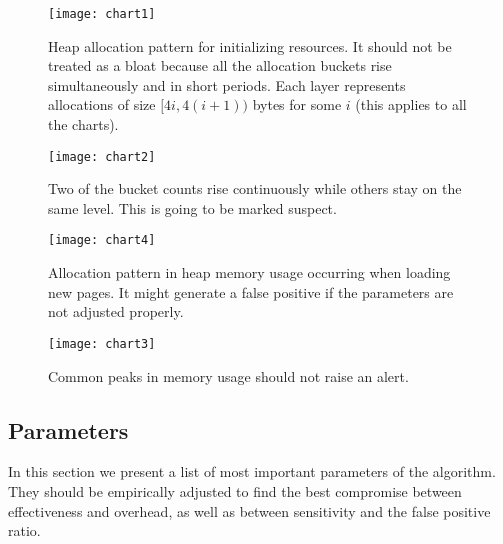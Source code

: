 \documentclass[preprint, numbers]{sigplanconf}
\begin{document}
\begin{figure}
\centering
\texttt{[image: chart1]}
\caption{Heap allocation pattern for initializing resources.
	It should not be treated as a bloat because all the allocation buckets rise
	simultaneously and in short periods.
	Each layer represents allocations of size $[4i, 4(i+1))$ bytes for some $i$
	(this applies to all the charts).}
\label{fig:chart1}
\vspace{0.5cm}

\texttt{[image: chart2]}
\caption{Two of the bucket counts rise continuously 
 while others stay on the same level.
 This is going to be marked suspect.}
\label{fig:chart2}
\end{figure}

\begin{figure}
\centering
\texttt{[image: chart4]}
	\caption{Allocation pattern in heap memory usage occurring when loading new pages.
	It might generate a false positive if the parameters are not adjusted properly.}
\label{fig:chart4}
\vspace{1.08cm}

\texttt{[image: chart3]}
	\caption{Common peaks in memory usage should not raise an alert.}
\label{fig:chart3}
\end{figure}

\subsection{Parameters}
\label{sec:params}

In this section we present a list of most important parameters of the algorithm.
They should be empirically adjusted to find the best compromise between
effectiveness and overhead, as well as between sensitivity and the false positive ratio.
\end{document}

